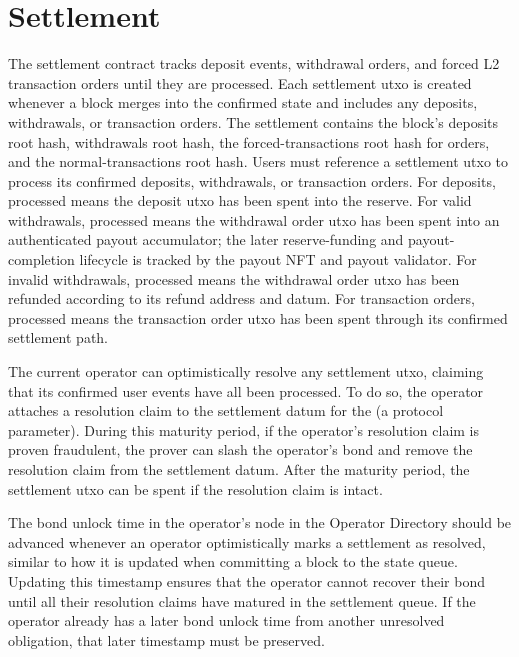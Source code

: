 \documentclass[../midgard.tex]{subfiles}
\begin{document}
\section{Settlement}
\label{h:settlement}

The settlement contract tracks deposit events, withdrawal orders, and forced L2 transaction orders until they are processed.
Each settlement utxo is created whenever a block merges into the confirmed state and includes any deposits, withdrawals, or transaction orders.
The settlement contains the block's deposits root hash, withdrawals root hash, the forced-transactions root hash for orders, and the normal-transactions root hash.
Users must reference a settlement utxo to process its confirmed deposits, withdrawals, or transaction orders.
For deposits, processed means the deposit utxo has been spent into the reserve.
For valid withdrawals, processed means the withdrawal order utxo has been spent into an authenticated payout accumulator; the later reserve-funding and payout-completion lifecycle is tracked by the payout NFT and payout validator.
For invalid withdrawals, processed means the withdrawal order utxo has been refunded according to its refund address and datum.
For transaction orders, processed means the transaction order utxo has been spent through its confirmed settlement path.

The current operator can optimistically resolve any settlement utxo, claiming that its confirmed user events have all been processed.
To do so, the operator attaches a resolution claim to the settlement datum for the  (a protocol parameter).
During this maturity period, if the operator's resolution claim is proven fraudulent, the prover can slash the operator's bond and remove the resolution claim from the settlement datum.
After the maturity period, the settlement utxo can be spent if the resolution claim is intact.


The bond unlock time in the operator's node in the Operator Directory should be advanced whenever an operator optimistically marks a settlement as resolved, similar to how it is updated when committing a block to the state queue.
Updating this timestamp ensures that the operator cannot recover their bond until all their resolution claims have matured in the settlement queue.
If the operator already has a later bond unlock time from another unresolved obligation, that later timestamp must be preserved.
\end{document}
